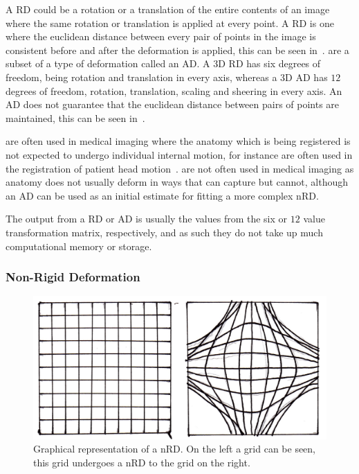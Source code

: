                 A \gls{RD} could be a rotation or a translation of the entire contents of an image where the same rotation or translation is applied at every point. A \gls{RD} is one where the euclidean distance between every pair of points in the image is consistent before and after the deformation is applied, this can be seen in~.  are a subset of a type of deformation called an \gls{AD}. A \gls{3D} \gls{RD} has six degrees of freedom, being rotation and translation in every axis, whereas a \gls{3D} \gls{AD} has $12$ degrees of freedom, rotation, translation, scaling and sheering in every axis. An \gls{AD} does not guarantee that the euclidean distance between pairs of points are maintained, this can be seen in~.
                
                 are often used in medical imaging where the anatomy which is being registered is not expected to undergo individual internal motion, for instance  are often used in the registration of patient head motion~\parencite{Hill2001}.  are not often used in medical imaging as anatomy does not usually deform in ways that  can capture but  cannot, although an \gls{AD} can be used as an initial estimate for fitting a more complex \gls{nRD}.
                
                The output from a \gls{RD} or \gls{AD} is usually the values from the six or $12$ value transformation matrix, respectively, and as such they do not take up much computational memory or storage.
                
            \subsubsection{Non-Rigid Deformation} \label{sec:non_rigid_deformation}
                \begin{figure}
                    \centering
                    
                    \includegraphics[width=1.0\linewidth]{figures/background_nRD.png}
                    
                    \captionsetup{singlelinecheck=false, justification=raggedright}
                    \caption{Graphical representation of a \gls{nRD}. On the left a grid can be seen, this grid undergoes a \gls{nRD} to the grid on the right.} \label{fig:non_rigid_deformation_nRD}
                \end{figure}
                

